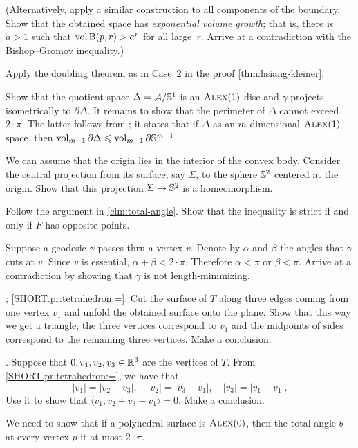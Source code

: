 (Alternatively, apply a similar construction to all components of the boundary.
Show that the obtained space has {}\emph{exponential volume growth};
that is, there is $a>1$ such that $\operatorname{\rm vol}\nolimits \mathrm{B}{}(p,r)>a^r$ for all large~$r$.
Arrive at a contradiction with the Bishop--Gromov inequality.)

Apply the doubling theorem as in Case~2 in the proof \ref{thm:hsiang-kleiner}.

Show that the quotient space $\Delta=\mathcal{A}/\mathbb{S}^1$ is an $\textsc{Alex}(1)$ disc and $\gamma$ projects isometrically to $\partial\Delta$.
It remains to show that the perimeter of $\Delta$ cannot exceed $2\cdot\pi$.
The latter follows from \cite[3.3.5]{petrunin:survey};
it states that if $\Delta$ as an $m$-dimensional $\textsc{Alex}(1)$ space, then $\operatorname{\rm vol}\nolimits_{m-1}\partial \Delta\leqslant \operatorname{\rm vol}\nolimits_{m-1}\partial \mathbb{S}^{m-1}$.

We can assume that the origin lies in the interior of the convex body.
Consider the central projection from its surface, say $\Sigma$, to the sphere $\mathbb{S}^2$ centered at the origin.
Show that this projection $\Sigma\to \mathbb{S}^2$ is a homeomorphism.

Follow the argument in \ref{clm:total-angle}.
Show that the inequality is strict if and only if $F$ has opposite points.


Suppose a geodesic $\gamma$ passes thru a vertex $v$.
Denote by $\alpha$ and $\beta$ the angles that $\gamma$ cuts at $v$.
Since $v$ is essential, $\alpha+\beta<2\cdot\pi$.
Therefore $\alpha<\pi$ or $\beta<\pi$.
Arrive at a contradiction by showing that $\gamma$ is not length-minimizing.

\parbf{\ref{pr:tetrahedron}}; \ref{SHORT.pr:tetrahedron:=}.
Cut the surface of $T$ along three edges coming from one vertex $v_1$ and unfold the obtained surface onto the plane.
Show that this way we get a triangle, the three vertices correspond to $v_1$ and the midpoints of sides correspond to the remaining three vertices.
Make a conclusion.

\parit{\ref{SHORT.pr:tetrahedron:perp}}.
Suppose that $0,v_1,v_2,v_3\in\mathbb{R}^3$ are the vertices of $T$.
From \ref{SHORT.pr:tetrahedron:=}, we have that 
\[|v_1|=|v_2-v_3|,\quad |v_2|=|v_3-v_1|,\quad|v_3|=|v_1-v_1|.\]
Use it to show that $\langle v_1,v_2+v_3-v_1\rangle=0$.
Make a conclusion.

We need to show that if a polyhedral surface is $\textsc{Alex}(0)$, then the total angle $\theta$ at every vertex $p$ it at most $2\cdot\pi$.

